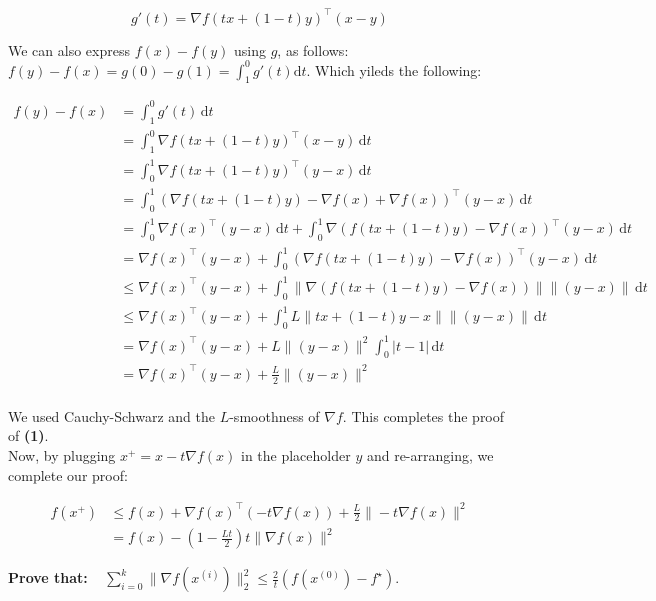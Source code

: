 \documentclass{article}
\theoremstyle{remark}
\theoremstyle{definition}
\begin{document}
\[
    g'(t) = \nabla f(tx +(1-t)y) ^\intercal (x-y)
\]

We can also express $f(x) - f(y)$ using $g$, as follows: $f(y)-f(x) = g(0) - g(1) = \int_1^0 \! g'(t) \mathrm{d}t$. Which yileds the following: 

\begin{align*}
f(y)-f(x) &= \int_1^0 \! g'(t) \, \mathrm{d}t \\
&= \int_1^0 \! \nabla f(tx +(1-t)y) ^\intercal (x-y) \, \mathrm{d}t \\
&= \int_0^1 \! \nabla f(tx +(1-t)y) ^\intercal (y-x) \, \mathrm{d}t \\
&= \int_0^1 \! (\nabla f(tx +(1-t)y)-\nabla f(x)+ \nabla f(x))^\intercal (y-x) \, \mathrm{d}t \\
&= \int_0^1 \! \nabla f(x)^\intercal (y-x) \, \mathrm{d}t + \int_0^1 \! \nabla (f(tx +(1-t)y)-\nabla f(x))^\intercal (y-x) \, \mathrm{d}t\\
&= \nabla f(x)^\intercal (y-x) + \int_0^1 \! (\nabla f(tx +(1-t)y)-\nabla f(x))^\intercal (y-x) \, \mathrm{d}t \\
&\leq \nabla f(x)^\intercal (y-x) + \int_0^1 \! \|\nabla (f(tx +(1-t)y)-\nabla f(x))\| \| (y-x)\| \, \mathrm{d}t  \\
&\leq \nabla f(x)^\intercal (y-x) + \int_0^1 \! L \|tx +(1-t)y-x\| \| (y-x)\| \, \mathrm{d}t  \\
&= \nabla f(x)^\intercal (y-x) + L\| (y-x)\|^2\int_0^1 \! \vert t-1 \vert \, \mathrm{d}t  \\
&= \nabla f(x)^\intercal (y-x) + \frac{L}{2}\| (y-x)\|^2 \\
\end{align*}

We used Cauchy-Schwarz and the $L$-smoothness of $\nabla f$. This completes the proof of \textbf{(1)}. \\

Now, by plugging $x^+ = x - t \nabla f(x)$ in the placeholder $y$ and re-arranging, we complete our proof:

\begin{align*}
f(x^+) &\leq f(x) + \nabla f(x)^\intercal (-t \nabla f(x))  + \frac{L}{2} \|-t \nabla f(x)\|^2 \\
&= f(x) - (1 - \frac{Lt}{2}) t \|\nabla f(x)\|^2 
\end{align*}

\begin{tcolorbox}
\center \textbf{Prove that:} $\, \, \,\,\, \sum_{i=0}^k \|\nabla f(x^{(i)})\|_2^2 \leq \frac{2}{t} ( f(x^{(0)}) - f^\star)$.
\end{tcolorbox}
\end{document}
